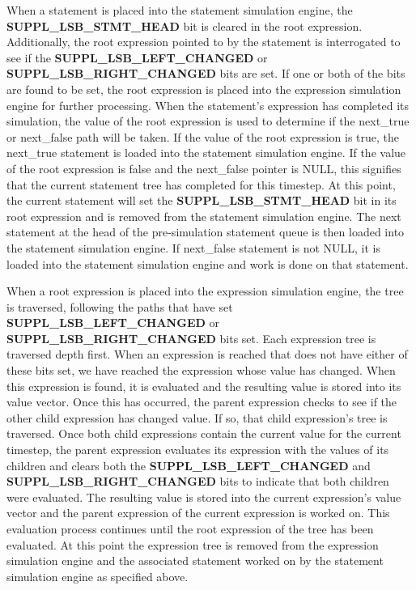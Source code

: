 \begin{Desc}
\item[]When a statement is placed into the statement simulation engine, the {\bf SUPPL\_\-LSB\_\-STMT\_\-HEAD} bit is cleared in the root expression. Additionally, the root expression pointed to by the statement is interrogated to see if the {\bf SUPPL\_\-LSB\_\-LEFT\_\-CHANGED} or {\bf SUPPL\_\-LSB\_\-RIGHT\_\-CHANGED} bits are set. If one or both of the bits are found to be set, the root expression is placed into the expression simulation engine for further processing. When the statement's expression has completed its simulation, the value of the root expression is used to determine if the next\_\-true or next\_\-false path will be taken. If the value of the root expression is true, the next\_\-true statement is loaded into the statement simulation engine. If the value of the root expression is false and the next\_\-false pointer is NULL, this signifies that the current statement tree has completed for this timestep. At this point, the current statement will set the {\bf SUPPL\_\-LSB\_\-STMT\_\-HEAD} bit in its root expression and is removed from the statement simulation engine. The next statement at the head of the pre-simulation statement queue is then loaded into the statement simulation engine. If next\_\-false statement is not NULL, it is loaded into the statement simulation engine and work is done on that statement.\end{Desc}
\begin{Desc}
\item[]When a root expression is placed into the expression simulation engine, the tree is traversed, following the paths that have set {\bf SUPPL\_\-LSB\_\-LEFT\_\-CHANGED} or {\bf SUPPL\_\-LSB\_\-RIGHT\_\-CHANGED} bits set. Each expression tree is traversed depth first. When an expression is reached that does not have either of these bits set, we have reached the expression whose value has changed. When this expression is found, it is evaluated and the resulting value is stored into its value vector. Once this has occurred, the parent expression checks to see if the other child expression has changed value. If so, that child expression's tree is traversed. Once both child expressions contain the current value for the current timestep, the parent expression evaluates its expression with the values of its children and clears both the {\bf SUPPL\_\-LSB\_\-LEFT\_\-CHANGED} and {\bf SUPPL\_\-LSB\_\-RIGHT\_\-CHANGED} bits to indicate that both children were evaluated. The resulting value is stored into the current expression's value vector and the parent expression of the current expression is worked on. This evaluation process continues until the root expression of the tree has been evaluated. At this point the expression tree is removed from the expression simulation engine and the associated statement worked on by the statement simulation engine as specified above.\end{Desc}


